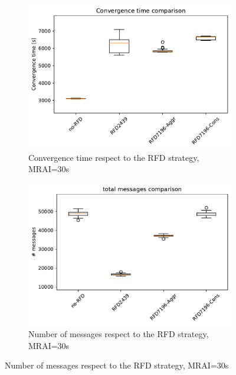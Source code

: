 \begin{figure}[H]
\begin{subfigure}[b]{0.325\textwidth}
         \label{fig:1000_RFD_MRAI30_suppressions_mice}
     \end{subfigure}
     \vfill
     \begin{subfigure}[b]{0.325\textwidth}
         \centering
         \includegraphics[width=\textwidth]{images/RFD/miceVSelephants/MultiMRAI/30/mice/cisco_1000MRAI30_rfd_comparison_time_boxplot.pdf}
         \caption{Convergence time respect to the RFD strategy, MRAI=30s}
         \label{fig:1000_RFD_MRAI30_time_mice}
     \end{subfigure}
     \hfill
     \begin{subfigure}[b]{0.325\textwidth}
         \centering
         \includegraphics[width=\textwidth]{images/RFD/miceVSelephants/MultiMRAI/30/mice/cisco_1000MRAI30_rfd_comparison_messages_boxplot.pdf}
         \caption{Number of messages respect to the RFD strategy, MRAI=30s}

\end{subfigure}
\end{figure}
